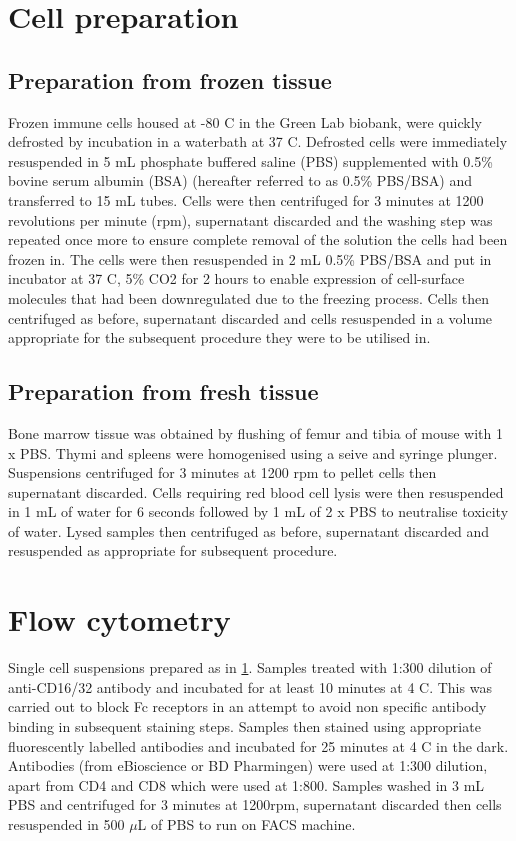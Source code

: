 \section{Cell preparation}
\label{sec:cellprep}

\subsection{Preparation from frozen tissue}

Frozen immune cells housed at -80 \textdegree C in the Green Lab biobank, were quickly defrosted by incubation in a waterbath at 37 \textdegree C.
Defrosted cells were immediately resuspended in 5 mL phosphate buffered saline (PBS) supplemented with 0.5\% bovine serum albumin (BSA) (hereafter referred to as 0.5\% PBS/BSA) and transferred to 15 mL tubes.
Cells were then centrifuged for 3 minutes at 1200 revolutions per minute (rpm), supernatant discarded and the washing step was repeated once more to ensure complete removal of the solution the cells had been frozen in.
The cells were then resuspended in 2 mL 0.5\% PBS/BSA and put in incubator at 37 \textdegree C, 5\% CO2  for 2 hours to enable expression of cell-surface molecules that had been downregulated due to the freezing process.
Cells then centrifuged as before, supernatant discarded and cells resuspended in a volume appropriate for the subsequent procedure they were to be utilised in.

\subsection{Preparation from fresh tissue}
Bone marrow tissue was obtained by flushing of femur and tibia of mouse with 1 x PBS.
Thymi and spleens were homogenised using a seive and syringe plunger.
Suspensions centrifuged for 3 minutes at 1200 rpm to pellet cells then supernatant discarded.
Cells requiring red blood cell lysis were then resuspended in 1 mL of water for 6 seconds followed by 1 mL of 2 x PBS to neutralise toxicity of water.
Lysed samples then centrifuged as before, supernatant discarded and resuspended as appropriate for subsequent procedure.

\section{Flow cytometry}

Single cell suspensions prepared as in \cref{sec:cellprep}.
Samples treated with 1:300 dilution of anti-CD16/32 antibody and incubated for at least 10 minutes at 4 \textdegree C.
This was carried out to block Fc receptors in an attempt to avoid non specific antibody binding in subsequent staining steps.
Samples then stained using appropriate fluorescently labelled antibodies and incubated for 25 minutes at 4 \textdegree C in the dark.
Antibodies (from eBioscience or BD Pharmingen) were used at 1:300 dilution, apart from CD4 and CD8 which were used at 1:800. 
Samples washed in 3 mL PBS and centrifuged for 3 minutes at 1200rpm, supernatant discarded then cells resuspended in 500 $\mu$L of PBS to run on FACS machine.

